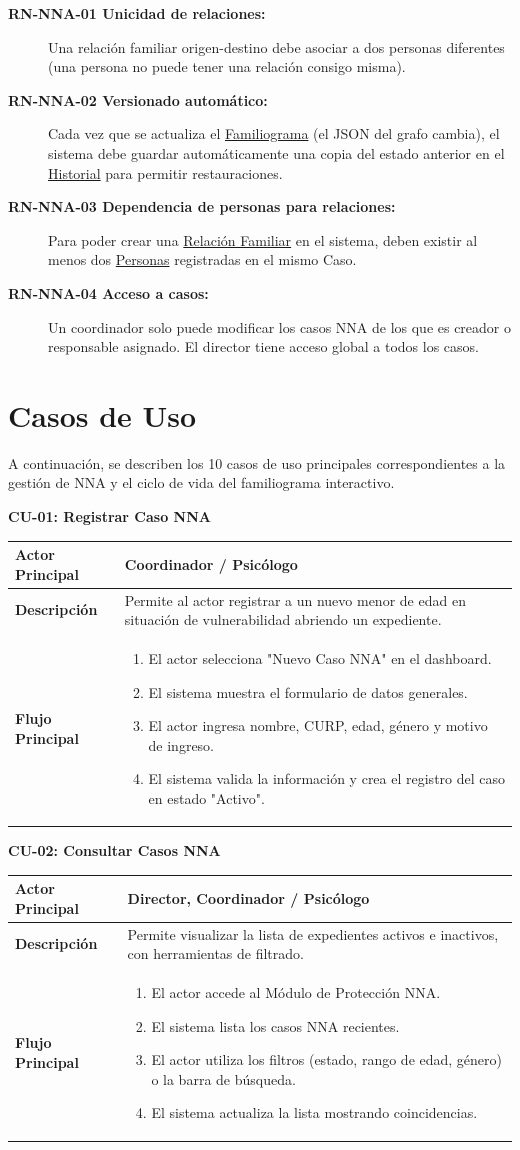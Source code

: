 \documentclass[12pt]{article}
\newcommand{\CasoDeUso}[5]{
    \vspace{1.5em}\noindent\textcolor{ipnGuinda}{\textbf{\Large CU-#1: #2}}\par\vspace{0.8em}
    \renewcommand{\arraystretch}{1.3}
    \begin{tabular}{|>{\columncolor{tablaHeader}\bfseries}p{3.5cm}|p{11.5cm}|}
    \hline
    Actor Principal & #3 \\
    \hline
    Descripción & #4 \\
    \hline
    Flujo Principal & #5 \\
    \hline
    \end{tabular}\vspace{1.5em}
}
\begin{document}
\begin{description}
    \item[\textbf{RN-NNA-01 Unicidad de relaciones:}] Una relación familiar origen-destino debe asociar a dos personas diferentes (una persona no puede tener una relación consigo misma).
    \item[\textbf{RN-NNA-02 Versionado automático:}] Cada vez que se actualiza el \hyperlink{tFamiliograma}{Familiograma} (el JSON del grafo cambia), el sistema debe guardar automáticamente una copia del estado anterior en el \hyperlink{tHistorialFamiliograma}{Historial} para permitir restauraciones.
    \item[\textbf{RN-NNA-03 Dependencia de personas para relaciones:}] Para poder crear una \hyperlink{tRelacionFamiliar}{Relación Familiar} en el sistema, deben existir al menos dos \hyperlink{tPersonaFamiliar}{Personas} registradas en el mismo Caso.
    \item[\textbf{RN-NNA-04 Acceso a casos:}] Un coordinador solo puede modificar los casos NNA de los que es creador o responsable asignado. El director tiene acceso global a todos los casos.
\end{description}

\section{Casos de Uso}

A continuación, se describen los 10 casos de uso principales correspondientes a la gestión de NNA y el ciclo de vida del familiograma interactivo.

\CasoDeUso{01}{Registrar Caso NNA}
{Coordinador / Psicólogo}
{Permite al actor registrar a un nuevo menor de edad en situación de vulnerabilidad abriendo un expediente.}
{
\begin{enumerate}
    \item El actor selecciona "Nuevo Caso NNA" en el dashboard.
    \item El sistema muestra el formulario de datos generales.
    \item El actor ingresa nombre, CURP, edad, género y motivo de ingreso.
    \item El sistema valida la información y crea el registro del caso en estado "Activo".
\end{enumerate}
}

\CasoDeUso{02}{Consultar Casos NNA}
{Director, Coordinador / Psicólogo}
{Permite visualizar la lista de expedientes activos e inactivos, con herramientas de filtrado.}
{
\begin{enumerate}
    \item El actor accede al Módulo de Protección NNA.
    \item El sistema lista los casos NNA recientes.
    \item El actor utiliza los filtros (estado, rango de edad, género) o la barra de búsqueda.
    \item El sistema actualiza la lista mostrando coincidencias.
\end{enumerate}
}
\end{document}
